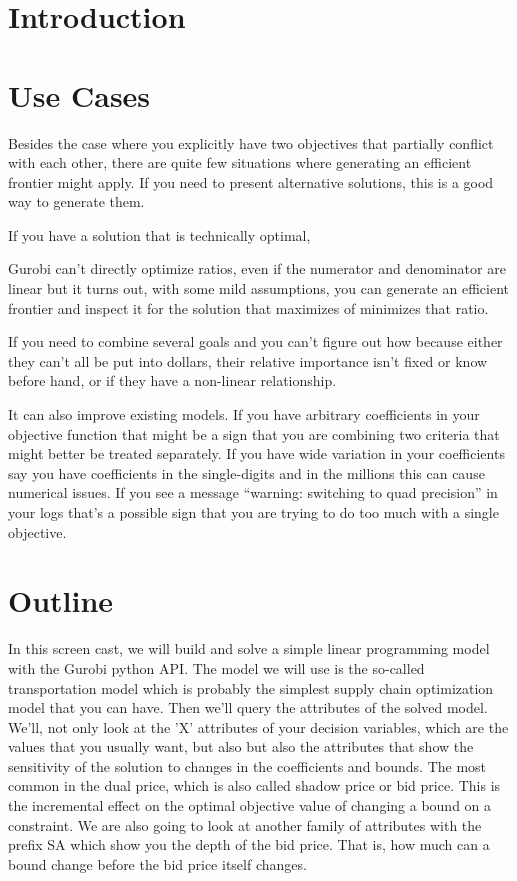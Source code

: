 \documentclass[12pt]{article}
\begin{document}
\section{Introduction}

\section{Use Cases}
Besides the case where you explicitly have two objectives
that partially conflict with each other,
there are quite few situations where generating an efficient
frontier might apply.  
If you need to present 
alternative solutions, this is a good way to generate them.

If you have a solution that is technically optimal,

Gurobi can't directly optimize ratios, even if the
numerator and denominator are linear 
but it turns out, with some mild assumptions, 
you can generate an efficient frontier and inspect
it for the solution that maximizes of minimizes
that ratio. 

If you need to combine several goals and you can't
figure out how because either they can't all be put
into dollars, their relative importance isn't fixed
or know before hand, or if they have a non-linear
relationship.

It can also improve existing models.
If you have arbitrary coefficients in your objective
function that might be a sign that you are combining 
two criteria that might better be treated separately.
If you have wide variation in your coefficients
say you have coefficients in the single-digits
and in the millions
this can cause numerical issues.
If you see a message
``warning: switching to quad precision'' 
in your logs that's a possible sign that
you are trying to do too much with a single
objective.





\section{Outline}
In this screen cast, we will build and solve a simple linear
programming model with the Gurobi python API.  
The model we will use is the so-called transportation model
which is probably the simplest supply chain optimization
model that you can have.
Then we'll query the
attributes of the solved model.  We'll, not only look at the 'X'
attributes of your decision variables, which are the values that you
usually want, but also but also the attributes that show the
sensitivity of the solution to changes in the coefficients and bounds.
The most common in the dual price, which is also called shadow price
or bid price.  This is the incremental effect on the optimal objective
value of changing a bound on a constraint.  We are also going to look
at another family of attributes with the prefix SA which show you the
depth of the bid price.  That is, how much can a bound change before
the bid price itself changes.
\end{document}
